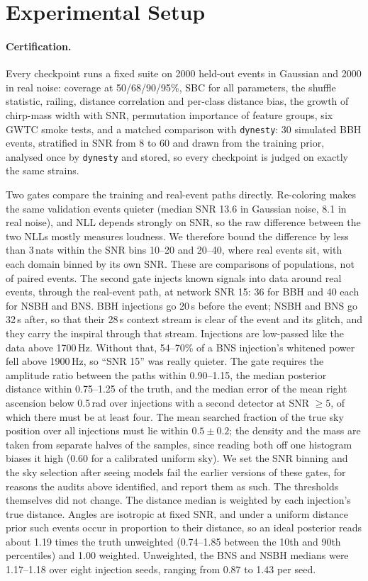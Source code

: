 \documentclass[twocolumn,linenumbers]{aastex701}
\begin{document}
\section{Experimental Setup} \label{sec:setup}

\paragraph{Certification.} Every checkpoint runs a fixed suite on 2000
held-out events in Gaussian and 2000 in real noise: coverage at 50/68/90/95\%,
SBC for all parameters, the shuffle statistic, railing, distance correlation
and per-class distance bias, the growth of chirp-mass width with SNR,
permutation importance of feature groups, six GWTC smoke tests, and a matched
comparison with \texttt{dynesty}: 30 simulated BBH events, stratified in SNR
from 8 to 60 and drawn from the training prior, analysed once by
\texttt{dynesty} and stored, so every checkpoint is judged on exactly the same
strains.

Two gates compare the training and real-event paths directly. Re-coloring makes the same
validation events quieter (median SNR 13.6 in Gaussian noise, 8.1 in real noise), and NLL depends
strongly on SNR, so the raw difference between the two NLLs mostly measures loudness. We
therefore bound the difference by less than 3\,nats within the SNR bins 10--20 and
20--40, where real events sit, with each domain binned by its own SNR. These are comparisons
of populations, not of paired events. The second gate injects known signals into data
around real events, through the real-event path, at network SNR 15: 36 for BBH and 40 each for NSBH and
BNS. BBH injections go 20\,s before the event; NSBH and BNS go 32\,s after, so that their 28\,s context stream is
clear of the event and its glitch, and they carry the inspiral through that stream.
Injections are low-passed like the data above 1700\,Hz. Without that, 54--70\% of a BNS
injection's whitened power fell above 1900\,Hz, so ``SNR 15'' was really quieter. The gate requires the amplitude ratio between
the paths within 0.90--1.15, the median posterior distance within 0.75--1.25 of the truth, and the median error of the mean
right ascension below 0.5\,rad over injections with a second detector at SNR $\geq 5$, of
which there must be at least four. The mean searched fraction of the true sky position
over all injections must lie within $0.5\pm0.2$; the density and the mass are taken from
separate halves of the samples, since reading both off one histogram biases it high
(0.60 for a calibrated uniform sky). We set the SNR binning and the sky selection after seeing
models fail the earlier versions of these gates, for reasons the audits above identified, and report them
as such. The thresholds themselves did not change. The distance median is weighted by each injection's true distance. Angles are isotropic at fixed SNR, and
under a uniform distance prior such events occur in proportion to their distance, so an ideal posterior reads about 1.19 times the truth unweighted (0.74--1.85 between the 10th and 90th percentiles) and 1.00 weighted. Unweighted, the BNS and NSBH medians were 1.17--1.18 over eight injection seeds, ranging from 0.87 to 1.43 per seed.
\end{document}
